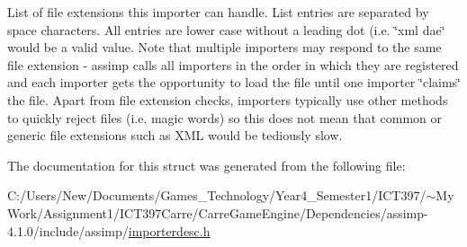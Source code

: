 List of file extensions this importer can handle. List entries are separated by space characters. All entries are lower case without a leading dot (i.e. \char`\"{}xml dae\char`\"{} would be a valid value. Note that multiple importers may respond to the same file extension - assimp calls all importers in the order in which they are registered and each importer gets the opportunity to load the file until one importer \char`\"{}claims\char`\"{} the file. Apart from file extension checks, importers typically use other methods to quickly reject files (i.e. magic words) so this does not mean that common or generic file extensions such as XML would be tediously slow. 

The documentation for this struct was generated from the following file:\begin{CompactItemize}
\item 
C:/Users/New/Documents/Games\_\-Technology/Year4\_\-Semester1/ICT397/$\sim$My Work/Assignment1/ICT397Carre/CarreGameEngine/Dependencies/assimp-4.1.0/include/assimp/\hyperlink{importerdesc_8h}{importerdesc.h}\end{CompactItemize}
